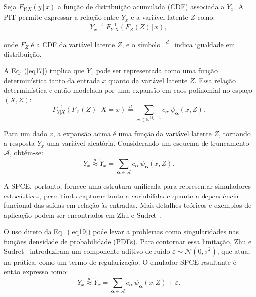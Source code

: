 Seja $F_{Y|X}(y\,|\,x)$ a função de distribuição acumulada (CDF) associada a $Y_x$.  
A PIT permite expressar a relação entre $Y_x$ e a variável latente $Z$ como:
\begin{equation}
  Y_x \stackrel{d}{=} F_{Y|X}^{-1}\!\left(F_Z(Z)\,|\,x\right),
  \label{eq17}
\end{equation}
 
onde $F_Z$ é a CDF da variável latente $Z$, e o símbolo $\stackrel{d}{=}$ indica igualdade em distribuição.

A Eq. (\ref{eq17}) implica que $Y_x$ pode ser representada como uma função determinística tanto da entrada $x$ 
quanto da variável latente $Z$. Essa relação determinística é então modelada por uma expansão em caos 
polinomial no espaço $(X, Z)$:
\begin{equation}
  F_{Y|X}^{-1}\!\left(F_Z(Z)\,|\,X = x\right)
\stackrel{d}{=}
\sum_{\boldsymbol{\alpha} \in \mathbb{N}^{M_X + 1}} 
c_{\boldsymbol{\alpha}} \, \psi_{\boldsymbol{\alpha}}(x, Z).
\label{eq18}
\end{equation}
 
Para um dado $x$, a expansão acima é uma função da variável latente $Z$, tornando a resposta $Y_x$ 
uma variável aleatória. Considerando um esquema de truncamento $\mathcal{A}$, obtém-se:
\begin{equation}
  Y_x \stackrel{d}{\approx} 
\tilde{Y}_x = 
\sum_{\boldsymbol{\alpha} \in \mathcal{A}} 
c_{\boldsymbol{\alpha}} \, \psi_{\boldsymbol{\alpha}}(x, Z).
\label{eq19}
\end{equation}
 
A SPCE, portanto, fornece uma estrutura unificada para representar simuladores estocásticos, 
permitindo capturar tanto a variabilidade quanto a dependência funcional das saídas em relação às entradas. 
Mais detalhes teóricos e exemplos de aplicação podem ser encontrados em Zhu e Sudret~\cite{Zhu2023_SPCE}.


O uso direto da Eq.~(\ref{eq19}) pode levar a problemas como singularidades nas funções densidade de probabilidade (PDFs).  
Para contornar essa limitação, Zhu e Sudret~\cite{Zhu2023_SPCE} introduziram um componente aditivo de ruído
\(\varepsilon \sim \mathcal{N}(0, \sigma^2)\), que atua, na prática, como um termo de regularização.  
O emulador SPCE resultante é então expresso como:
\begin{equation}
Y_x \stackrel{d}{\approx} 
\tilde{Y}_x =
\sum_{\boldsymbol{\alpha} \in \mathcal{A}}
c_{\boldsymbol{\alpha}} \, \psi_{\boldsymbol{\alpha}}(x, Z)
+ \varepsilon.
\label{eq:spce_noise}
\end{equation}

